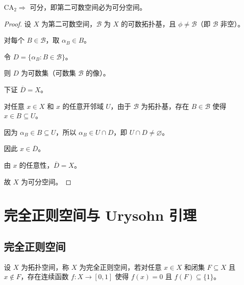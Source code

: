 \documentclass[lang=cn,a4paper,newtx,figureplace=section,tableplace=section]{elegantbook}
\begin{document}
\begin{proposition}\label{prop:CA2-implies-separable}
$\text{CA}_2 \Rightarrow$ 可分，即第二可数空间必为可分空间。
\end{proposition}
\begin{proof}
设 $X$ 为第二可数空间，$\mathcal{B}$ 为 $X$ 的可数拓扑基，且 $\phi \neq \mathcal{B}$（即 $\mathcal{B}$ 非空）。

对每个 $B \in \mathcal{B}$，取 $\alpha_B \in B$。

令 $D = \{\alpha_B : B \in \mathcal{B}\}$。

则 $D$ 为可数集（可数集 $\mathcal{B}$ 的像）。

下证 $\overline{D} = X$。

对任意 $x \in X$ 和 $x$ 的任意开邻域 $U$，由于 $\mathcal{B}$ 为拓扑基，存在 $B \in \mathcal{B}$ 使得 $x \in B \subseteq U$。

因为 $\alpha_B \in B \subseteq U$，所以 $\alpha_B \in U \cap D$，即 $U \cap D \neq \varnothing$。

因此 $x \in \overline{D}$。

由 $x$ 的任意性，$\overline{D} = X$。

故 $X$ 为可分空间。
\end{proof}

\chapter{完全正则空间与 Urysohn 引理}

\section{完全正则空间}

\begin{definition}[完全正则空间]\label{def:completely-regular-space}
设 $X$ 为拓扑空间，称 $X$ 为完全正则空间，若对任意 $x \in X$ 和闭集 $F \subseteq X$ 且 $x \notin F$，存在连续函数 $f: X \to [0,1]$ 使得 $f(x) = 0$ 且 $f(F) \subseteq \{1\}$。
\end{definition}
\end{document}
